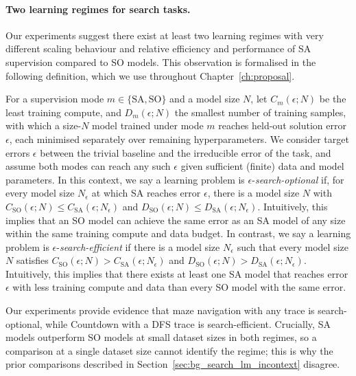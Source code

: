 \paragraph{Two learning regimes for search tasks.}
Our experiments suggest there exist at least two learning regimes with very different scaling behaviour and relative efficiency and performance of SA supervision compared to SO models.
This observation is formalised in the following definition, which we use throughout Chapter~\ref{ch:proposal}.
\begin{tcolorbox}[title=Definition (Learning regimes), colback=ThesisGrey!5, colframe=ThesisGrey, fonttitle=\bfseries]
For a supervision mode $m \in \{\text{SA}, \text{SO}\}$ and a model size $N$, let $C_m(\epsilon; N)$ be the least training compute, and $D_m(\epsilon; N)$ the smallest number of training samples, with which a size-$N$ model trained under mode $m$ reaches held-out solution error $\epsilon$, each minimised separately over remaining hyperparameters.
We consider target errors $\epsilon$ between the trivial baseline and the irreducible error of the task, and assume both modes can reach any such $\epsilon$ given sufficient (finite) data and model parameters.
In this context, we say a learning problem is $\epsilon$-\emph{search-optional} if, for every model size $N_\epsilon$ at which SA reaches error $\epsilon$, there is a model size $N$ with $C_\text{SO}(\epsilon; N) \le C_\text{SA}(\epsilon; N_\epsilon)$ and $D_\text{SO}(\epsilon; N) \le D_\text{SA}(\epsilon; N_\epsilon)$. Intuitively, this implies that an SO model can achieve the same error as an SA model of any size within the same training compute and data budget.
In contrast, we say a learning problem is $\epsilon$-\emph{search-efficient} if there is a model size $N_\epsilon$ such that every model size $N$ satisfies $C_\text{SO}(\epsilon; N) > C_\text{SA}(\epsilon; N_\epsilon)$ and $D_\text{SO}(\epsilon; N) > D_\text{SA}(\epsilon; N_\epsilon)$. Intuitively, this implies that there exists at least one SA model that reaches error $\epsilon$ with less training compute and data than every SO model with the same error.
\end{tcolorbox}
Our experiments provide evidence that maze navigation with any trace is search-optional, while Countdown with a DFS trace is search-efficient.
Crucially, SA models outperform SO models at small dataset sizes in both regimes, so a comparison at a single dataset size cannot identify the regime; this is why the prior comparisons described in Section~\ref{sec:bg_search_lm_incontext} disagree.

